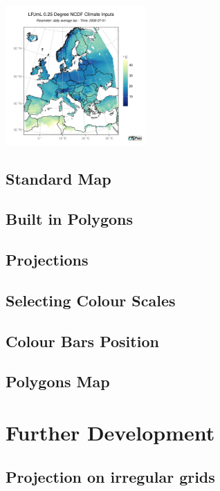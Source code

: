 \documentclass[a4paper,10pt]{article}
\begin{document}
\includegraphics[width=0.4\textwidth, height=0.4\textwidth]{col_15}




\subsection{Standard Map}
\subsection{Built in Polygons}
\subsection{Projections}
\subsection{Selecting Colour Scales}
\subsection{Colour Bars Position}
\subsection{Polygons Map}
\section{Further Development}
\subsection{Projection on irregular grids}
\end{document}
